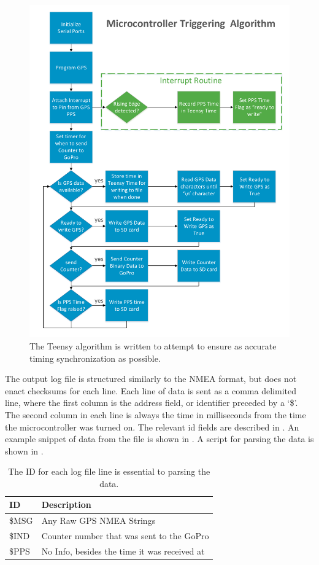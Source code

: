 \begin{figure}[H]
	\centering
	\includegraphics[scale = 0.4]{../figures/TeensyFlowchart.pdf}
	\caption{The Teensy algorithm is written to attempt to ensure as accurate timing synchronization as possible.  }
	\label{fig:TeensyFlow}
\end{figure}

The output log file is structured similarly to the NMEA format, but does not enact checksums for each line.  Each line of data is sent as a comma delimited line, where the first column is the address field, or identifier preceded by a `\$'.  The second column in each line is always the time in milliseconds from the time the microcontroller was turned on.  The relevant id fields are described in .  An example snippet of data from the file is shown in .  A script for parsing the data is shown in .
 \begin{table}[h]
 	\centering
 	\begin{tabular}{ll}
 		\toprule
 		ID & Description \\
 		\midrule
		\$MSG & Any Raw GPS NMEA Strings \\
		\$IND & Counter number that was sent to the GoPro \\
		\$PPS & No Info, besides the time it was received at \\
 		\bottomrule
 	\end{tabular}
 	\caption{The ID for each log file line is essential to parsing the data.}
 	\label{tab:nmea}
 \end{table}
 
